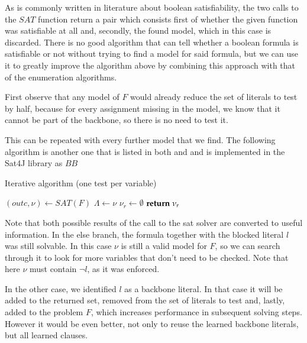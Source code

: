 As is commonly written in literature about boolean satisfiability, the two calls to the $SAT$ function return a pair which consists first of whether the given function was satisfiable at all and, secondly, the found model, which in this case is discarded. There is no good algorithm that can tell whether a boolean formula is satisfiable or not without trying to find a model for said formula, but we can use it to greatly improve the algorithm above by combining this approach with that of the enumeration algorithms.

First observe that any model of $F$ would already reduce the set of literals to test by half, because for every assignment missing in the model, we know that it cannot be part of the backbone, so there is no need to test it. 

This can be repeated with every further model that we find. The following algorithm is another one that is listed in both \cite{mjl10} and \cite{mjl15} and is implemented in the Sat4J library as $BB$

\begin{algorithm}
\caption{{\sc Iterative algorithm (one test per variable)}}
\DontPrintSemicolon
{}

$(outc,\nu) \gets SAT(F)$\;
$\Lambda \gets \nu$\;
$\nu_r \gets \emptyset$\;
$\Return \; \nu_r$\;
\end{algorithm}

Note that both possible results of the call to the sat solver are converted to useful information. In the else branch, the formula together with the blocked literal $l$ was still solvable. In this case $\nu$ is still a valid model for $F$, so we can search through it to look for more variables that don't need to be checked. Note that here $\nu$ must contain $\neg l$, as it was enforced.

In the other case, we identified $l$ as a backbone literal. In that case it will be added to the returned set, removed from the set of literals to test and, lastly, added to the problem $F$, which increases performance in subsequent solving steps. However it would be even better, not only to reuse the learned backbone literals, but all learned clauses.




